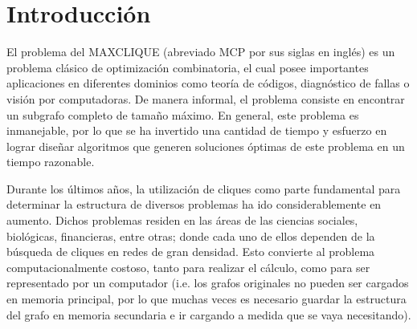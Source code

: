 \documentclass[conference]{IEEEtran}
\begin{document}




\maketitle






%
\IEEEpeerreviewmaketitle



\section{Introducción}
\label{sec:intro}

El problema del \textsf{MAXCLIQUE} (abreviado MCP por sus siglas en
inglés) es un problema clásico de optimización combinatoria, el cual
posee importantes aplicaciones en diferentes dominios como teoría de
códigos, diagnóstico de fallas o visión por computadoras. De manera
informal, el problema consiste en encontrar un subgrafo completo de
tamaño máximo. En general, este problema es inmanejable, por lo que se
ha invertido una cantidad de tiempo y esfuerzo en lograr diseñar
algoritmos que generen soluciones óptimas de este problema en un
tiempo razonable.

Durante los últimos años, la utilización de cliques como parte
fundamental para determinar la estructura de diversos problemas ha ido
considerablemente en aumento. Dichos problemas residen en las áreas de
las ciencias sociales, biológicas, financieras, entre otras; donde
cada uno de ellos dependen de la búsqueda de cliques en redes de gran
densidad. Esto convierte al problema computacionalmente costoso, tanto
para realizar el cálculo, como para ser representado por un computador
(i.e. los grafos originales no pueden ser cargados en memoria
principal, por lo que muchas veces es necesario guardar la estructura
del grafo en memoria secundaria e ir cargando a medida que se vaya
necesitando).
\end{document}
